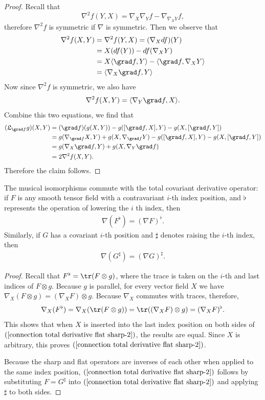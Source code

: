 \begin{proof}
Recall that
\[\nabla^2f(Y,X)=\nabla_X\nabla_Yf-\nabla_{\nabla_XY}f,\]
therefore $\nabla^2f$ is symmetric if $\nabla$ is symmetric. Then we observe that
\begin{align*}
\nabla^2f(X,Y)&=\nabla^2f(Y,X)=(\nabla_Xdf)(Y)\\
&=X(df(Y))-df(\nabla_XY)\\
&=X\langle\grad f,Y\rangle-\langle\grad f,\nabla_XY\rangle\\
&=\langle\nabla_X\grad f,Y\rangle
\end{align*}
Now since $\nabla^2f$ is symmetric, we also have
\[\nabla^2f(X,Y)=\langle\nabla_Y\grad f,X\rangle.\]
Combine this two equations, we find that
\begin{align*}
(\mathfrak{L}_{\grad f}g)(X,Y)&=(\grad f)(g(X,Y))-g([\grad f,X],Y)-g(X,[\grad f,Y])\\
&=g(\nabla_{\grad f}X,Y)+g(X,\nabla_{\grad f}Y)-g([\grad f,X],Y)-g(X,[\grad f,Y])\\
&=g(\nabla_{X}\grad f,Y)+g(X,\nabla_Y\grad f)\\
&=2\nabla^2f(X,Y).
\end{align*}
Therefore the claim follows.
\end{proof}
\begin{proposition}\label{connection total derivative flat sharp}
The musical isomorphisms commute with the total covariant derivative operator: if $F$ is any smooth tensor field with a contravariant $i$-th index position, and $\flat$ 
represents the operation of lowering the $i$ th index, then
\begin{align}\label{connection total derivative flat sharp-1}
\nabla(F^\flat)=(\nabla F)^\flat.
\end{align}
Similarly, if $G$ has a covariant $i$-th position and $\sharp$ denotes raising the $i$-th index, then
\begin{align}\label{connection total derivative flat sharp-2}
\nabla(G^\sharp)=(\nabla G)^\sharp.
\end{align}
\end{proposition}
\begin{proof}
Recall that $F^{\flat}=\tr(F\otimes g)$, where the trace is taken on the $i$-th and last indices of $F\otimes g$. Because $g$ is parallel, for every vector field $X$ we 
have $\nabla_X(F\otimes g)=(\nabla_X F)\otimes g$. Because $\nabla_X$ commutes with traces, therefore,
\[\nabla_X(F^\flat)=\nabla_X(\tr(F\otimes g))=\tr((\nabla_XF)\otimes g)=(\nabla_XF)^\flat.\]
This shows that when $X$ is inserted into the last index position on both sides of $(\ref{connection total derivative flat sharp-2})$, the results are equal. Since $X$ 
is arbitrary, this proves $(\ref{connection total derivative flat sharp-2})$.\par
Because the sharp and flat operators are inverses of each other when applied to the same index position, $(\ref{connection total derivative flat sharp-2})$ follows by 
substituting $F=G^\sharp$ into $(\ref{connection total derivative flat sharp-2})$ and applying $\sharp$ to both sides.
\end{proof}
